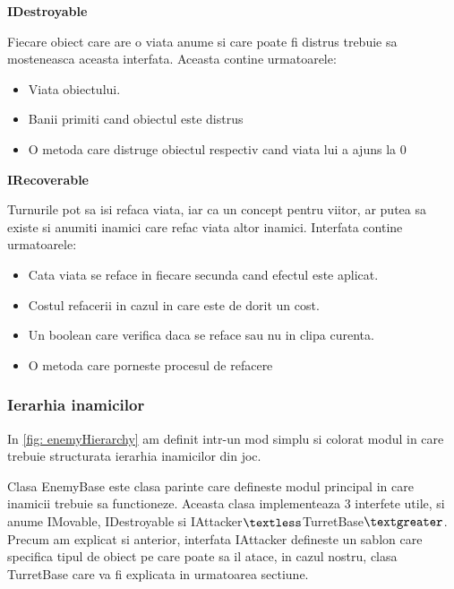 \documentclass[12pt, a4paper]{article}
\begin{document}
 	\textbf{IDestroyable}
 	
 	Fiecare obiect care are o viata anume si care poate fi distrus trebuie sa mosteneasca aceasta interfata. Aceasta contine urmatoarele:
 	
 	\begin{itemize}
 		\item Viata obiectului.
 		\item Banii primiti cand obiectul este distrus
 		\item O metoda care distruge obiectul respectiv cand viata lui a ajuns la 0
 	\end{itemize}
 	\bigskip
 	
 	\textbf{IRecoverable}
 	
 	Turnurile pot sa isi refaca viata, iar ca un concept pentru viitor, ar putea sa existe si anumiti inamici care refac viata altor inamici. Interfata contine urmatoarele:
 	
 	\begin{itemize}
 		\item Cata viata se reface in fiecare secunda cand efectul este aplicat.
 		\item Costul refacerii in cazul in care este de dorit un cost.
 		\item Un boolean care verifica daca se reface sau nu in clipa curenta.
 		\item O metoda care porneste procesul de refacere
 	\end{itemize}
	
	
	
	
	
	\subsubsection{Ierarhia inamicilor}
	

	In \ref{fig: enemyHierarchy} am definit intr-un mod simplu si colorat modul in care trebuie structurata ierarhia inamicilor din joc.
	\newline
	
	Clasa EnemyBase este clasa parinte care defineste modul principal in care inamicii trebuie sa functioneze. Aceasta clasa implementeaza 3 interfete utile, si anume IMovable, IDestroyable si IAttacker$\textless$TurretBase$\textgreater$. Precum am explicat si anterior, interfata IAttacker defineste un sablon care specifica tipul de obiect pe care poate sa il atace, in cazul nostru, clasa TurretBase care va fi explicata in urmatoarea sectiune.
	\newline
	
\end{document}
